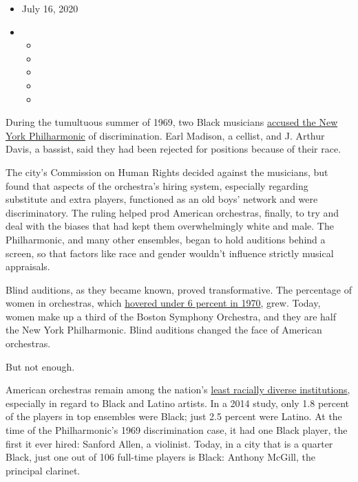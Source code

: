 \begin{itemize}
\item
  July 16, 2020
\item
  \begin{itemize}
  \item
  \item
  \item
  \item
  \item
  \end{itemize}
\end{itemize}

During the tumultuous summer of 1969, two Black musicians
\href{https://www.nytimes.com/2011/02/04/arts/music/04archive.html}{accused
the New York Philharmonic} of discrimination. Earl Madison, a cellist,
and J. Arthur Davis, a bassist, said they had been rejected for
positions because of their race.

The city's Commission on Human Rights decided against the musicians, but
found that aspects of the orchestra's hiring system, especially
regarding substitute and extra players, functioned as an old boys'
network and were discriminatory. The ruling helped prod American
orchestras, finally, to try and deal with the biases that had kept them
overwhelmingly white and male. The Philharmonic, and many other
ensembles, began to hold auditions behind a screen, so that factors like
race and gender wouldn't influence strictly musical appraisals.

Blind auditions, as they became known, proved transformative. The
percentage of women in orchestras, which
\href{https://gap.hks.harvard.edu/orchestrating-impartiality-impact-\%E2\%80\%9Cblind\%E2\%80\%9D-auditions-female-musicians}{hovered
under 6 percent in 1970}, grew. Today, women make up a third of the
Boston Symphony Orchestra, and they are half the New York Philharmonic.
Blind auditions changed the face of American orchestras.

But not enough.

American orchestras remain among the nation's
\href{https://www.nytimes.com/2018/04/18/arts/music/symphony-orchestra-diversity.html}{least
racially diverse institutions}, especially in regard to Black and Latino
artists. In a 2014 study, only 1.8 percent of the players in top
ensembles were Black; just 2.5 percent were Latino. At the time of the
Philharmonic's 1969 discrimination case, it had one Black player, the
first it ever hired: Sanford Allen, a violinist. Today, in a city that
is a quarter Black, just one out of 106 full-time players is Black:
Anthony McGill, the principal clarinet.

